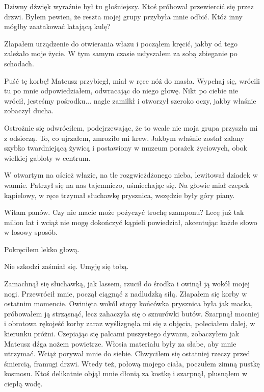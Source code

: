 Dziwny dźwięk wyraźnie był tu głośniejszy. Ktoś próbował przewiercić się przez drzwi.
Byłem pewien, że reszta mojej grupy przybyła mnie odbić.
Któż inny mógłby zaatakować latającą kulę?

Złapałem urządzenie do otwierania włazu i począłem kręcić, jakby od tego zależało moje życie.
W tym samym czasie usłyszałem za sobą zbieganie po schodach.
\begin{dialogue}
\ds{} Puść tę korbę! \dm{} Mateusz przybiegł, miał w ręce nóż do masła.
\ds{} Wypchaj się, wrócili tu po mnie \dm{} odpowiedziałem, odwracając do niego głowę.
\ds{} Nikt po ciebie nie wrócił, jesteśmy pośrodku... \dm{} nagle zamilkł i otworzył szeroko oczy, jakby właśnie zobaczył ducha.
\end{dialogue}
Ostrożnie się odwróciłem, podejrzewając, że to wcale nie moja grupa przyszła mi z odsieczą.
To, co ujrzałem, zmroziło mi krew. Jakbym właśnie został zalany szybko twardniejącą żywicą i postawiony w muzeum porażek życiowych, obok wielkiej gabloty w centrum.

W otwartym na oścież włazie, na tle rozgwieżdżonego nieba, lewitował dziadek w wannie.
Patrzył się na nas tajemniczo, uśmiechając się. Na głowie miał czepek kąpielowy, w ręce trzymał słuchawkę prysznica, wszędzie były góry piany.
\begin{dialogue}
\ds{} Witam panów. Czy nie macie może pożyczyć trochę szamponu? Lecę już tak milion lat i wciąż nie mogę dokończyć kąpieli \dm{}
powiedział, akcentując każde słowo w losowy sposób.
\end{dialogue}
Pokręciłem lekko głową.
\begin{dialogue}
\ds{} Nie szkodzi \dm{} zaśmiał się. \dm{} Umyję się tobą.
\end{dialogue}
Zamachnął się słuchawką, jak lassem, rzucił do środka i owinął ją wokół mojej nogi.
Przewrócił mnie, począł ciągnąć z nadludzką siłą. Złapałem się korby w ostatnim momencie.
Owinięta wokół stopy końcówka prysznica była jak macka, próbowałem ją strząsnąć, lecz zahaczyła się o sznurówki butów.
Szarpnął mocniej i obrotowa rękojeść korby zaraz wyślizgnęła mi się z objęcia, poleciałem dalej, w kierunku próżni.
Czepiając się palcami puszystego dywanu, zobaczyłem jak Mateusz dźga nożem powietrze.
Włosia materiału były za słabe, aby mnie utrzymać. Wciąż porywał mnie do siebie. Chwyciłem się ostatniej rzeczy przed śmiercią, framugi drzwi.
Wtedy też, połową mojego ciała, poczułem zimną pustkę kosmosu.
Ktoś delikatnie objął mnie dłonią za kostkę i szarpnął, plusnąłem w ciepłą wodę.

